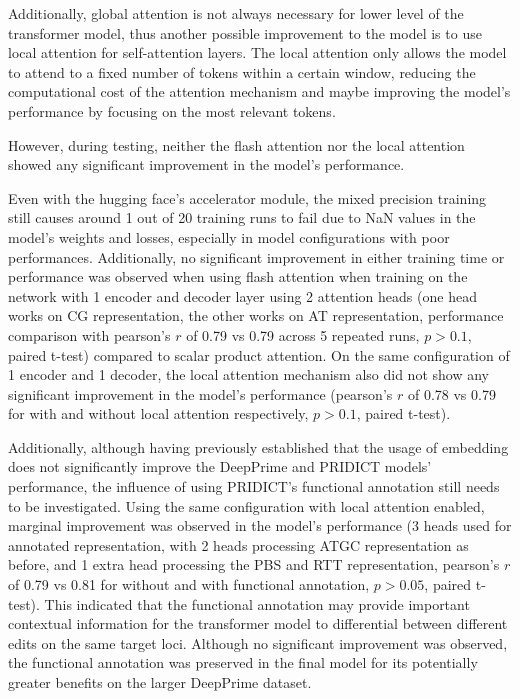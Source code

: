 Additionally, global attention is not always necessary for lower level of the transformer model\cite{raeTransformersNeedDeep2020}, thus another 
possible improvement to the model is to use local attention for self-attention layers. The local attention only allows the model to attend to a fixed number of tokens within a certain window, reducing the computational cost of the attention mechanism and maybe improving the model's performance by focusing on the most relevant tokens.

However, during testing, neither the flash attention nor the local attention showed any significant improvement in the model's performance.

Even with the hugging face's accelerator module, the mixed precision training still causes around 1 out of 20 training runs to fail due to NaN values in the model's weights and losses, especially in model configurations with poor performances. Additionally, no significant improvement in either training time or performance was observed when using flash attention when training on the network with 1 encoder and decoder layer using 2 attention heads (one head works on CG representation, the other works on AT representation, performance comparison with pearson's $r$ of 0.79 vs 0.79 across 5 repeated runs, $p>0.1$, paired t-test) compared to scalar product attention. On the same configuration of 1 encoder and 1 decoder, the local attention mechanism also did not show any significant improvement in the model's performance (pearson's $r$ of 0.78 vs 0.79 for with and without local attention respectively, $p>0.1$, paired t-test).

Additionally, although having previously established that the usage of embedding does not significantly improve the DeepPrime and PRIDICT models' performance, the influence of using PRIDICT's functional annotation still needs to be investigated. Using the same configuration with local attention enabled, marginal improvement was observed in the model's performance (3 heads used for annotated representation, with 2 heads processing ATGC representation as before, and 1 extra head processing the PBS and RTT representation, pearson's $r$ of 0.79 vs 0.81 for without and with functional annotation, $p>0.05$, paired t-test). This indicated that the functional annotation may provide important contextual information for the transformer model to differential between different edits on the same target loci. Although no significant improvement was observed, the functional annotation was preserved in the final model for its potentially greater benefits on the larger DeepPrime dataset.

